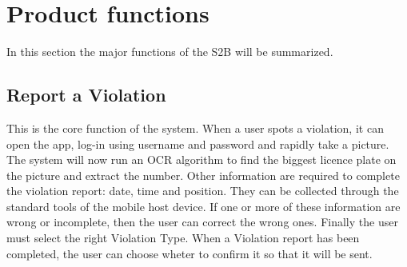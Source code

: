 \section{Product functions}
In this section the major functions of the S2B will be summarized.

\subsection{Report a Violation}
This is the core function of the system. When a user spots a violation, it can open the app, log-in using username and password and rapidly take a picture.
The system will now run an OCR algorithm to find the biggest licence plate on the picture and extract the number. Other information are required to complete the violation report: date, time and position. They can be collected through the standard tools of the mobile host device. If one or more of these information are wrong or incomplete, then the user can correct the wrong ones. Finally the user must select the right Violation Type. When a Violation report has been completed, the user can choose wheter to confirm it so that it will be sent.
